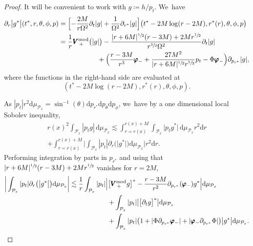 \documentclass[JEP,XML,SOM,Unicode,published]{cedram}
\theoremstyle{plain}
\theoremstyle{definition}
\newcommand\dr{{\mathrm{d}}}
\begin{document}
\begin{proof}
It will be convenient to work with $g\coloneqq h/p_t$. We~have
\begin{align*}
\partial_r\big|g^*\big|(t^*,r,\theta,\phi,p) & = \Bigl[ -\frac{2M}{r \Omega^2} \partial_t | g|+\frac{1}{\Omega^2} \partial_{r^*} |g | \Bigr] \bigl(t^*-2M\log(r-2M),r^*(r),\theta,\phi,p \bigr) \\
& = \frac{1}{r} \pmb{V}_{\, +}^{ \mathrm{mod}}\bigl(|g| \bigr)-\frac{|r+6M|^{\sfrac{1}{2}}(r-3M)+2Mr^{\sfrac{1}{2}}}{r^{\sfrac{3}{2}}\Omega^2} \partial_t |g| \\
& \hspace*{2cm} +\Bigl(\frac{r-3M}{r^3} \pmb{\varphi}_- +\frac{27M^2 }{|r+6M|^{\sfrac{1}{2}}r^{\sfrac{5}{2}}}p_t - \Phi \pmb{\varphi}_-\Bigr) \partial_{p_{r^*}}|g|,
\end{align*}
where the functions in the right-hand side are evaluated at
\[
(t^*-2M\log(r-2M),r^*(r),\theta,\phi,p).
\]

As $|p_t|r^2 \dr \mu_{\mathcal{P}_x}= \sin^{-1} (\theta)\dr p_{r^*} \dr p_\theta \dr p_\phi$, we~have by a one dimensional local Sobolev inequality,
\begin{multline*}
r(x)^2 \! \int_{\mathcal{P}_x} |p_t g| \, \dr \mu_{\mathcal{P}_x} \lesssim \int_{r=r(x)}^{r(x)+M} \int_{\mathcal{P}_x} \big|p_t g^*\big| \, \dr \mu_{\mathcal{P}_x} r^2 \dr r \\
+\int_{r=r(x)}^{r(x)+M} \bigg| \int_{\mathcal{P}_x}|p_t|\partial_r\bigl(\big| g^*\big|\bigr) \dr \mu_{\mathcal{P}_x} \bigg| r^2 \dr r.
\end{multline*}
Performing integration by parts in $p_{r^*}$ and using that $|r+6M|^{\sfrac{1}{2}}(r-3M)+2Mr^{\sfrac{1}{2}}$ vanishes for $r=2M$,
\begin{align*}
\bigg| \int_{\mathcal{P}_x}|p_t|\partial_r\bigl(\big| g^* \big|\bigr) \dr \mu_{\mathcal{P}_x} \bigg| & \lesssim \frac{1}{r} \int_{\mathcal{P}_x}|p_t| \Bigl | \bigl[ \pmb{V}_{\, +}^{ \mathrm{mod}} g \bigr]^* -\frac{r-3M}{r^2} \partial_{p_{r^*}}(\pmb{\varphi}_-) g^* \Bigr| \dr \mu_{\mathcal{P}_x} \\
& \hspace*{2cm}+ \int_{\mathcal{P}_x}|p_t| \big| \bigl[ \partial_t g \bigr]^* \big| \dr \mu_{\mathcal{P}_x} \\
& \hspace*{2cm}+ \int_{\mathcal{P}_x} |p_t|\bigl(1+ |\Phi \partial_{p_{r^*}} \pmb{\varphi}_-|+|\pmb{\varphi}_- \partial_{p_{r^*}} \Phi |\bigr) \big| g^* \big| \dr \mu_{\mathcal{P}_x}.
\end{align*}


\end{proof}
\end{document}
